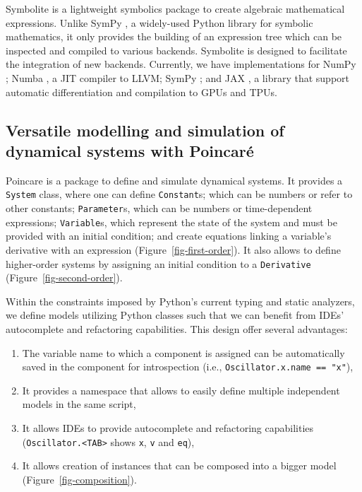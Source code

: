\documentclass{article}
\providecommand{\tightlist}{%
  \setlength{\itemsep}{0pt}\setlength{\parskip}{0pt}}\usepackage{longtable,booktabs}
\begin{document}
Symbolite is a lightweight symbolics package to create algebraic mathematical expressions.
Unlike SymPy \cite{meurerSymPySymbolicComputing2017},
a widely-used Python library for symbolic mathematics,
it only provides the building of an expression tree
which can be inspected and compiled to various backends.
Symbolite is designed to facilitate the integration of new backends.
Currently, we have implementations for
NumPy \cite{harrisArrayProgrammingNumPy2020};
Numba \cite{lamNumbaLLVMbasedPython2015},
a \ac{JIT} compiler to LLVM;
SymPy \cite{meurerSymPySymbolicComputing2017};
and JAX \cite{jax2018github}, a
library that support automatic differentiation and compilation to \acp{GPU} and \acp{TPU}.

\hypertarget{versatile-modelling-and-simulation-of-dynamical-systems-with-poincaruxe9}{%
\subsection{Versatile modelling and simulation of dynamical systems with
Poincaré}\label{versatile-modelling-and-simulation-of-dynamical-systems-with-poincaruxe9}}

Poincare is a package to define and simulate dynamical systems.
It provides a \texttt{System} class,
where one can define
\texttt{Constant}s; which can be numbers or refer to other constants;
\texttt{Parameter}s, which can be numbers or time-dependent expressions;
\texttt{Variable}s, which represent the state of the system and must be provided with an initial condition;
and create equations linking a variable's derivative with an expression (Figure~\ref{fig-first-order}).
It also allows to define higher-order systems
by assigning an initial condition to a \texttt{Derivative} (Figure~\ref{fig-second-order}).

Within the constraints imposed by Python's current typing and static analyzers,
we define models utilizing Python classes
such that we can benefit from \acp{IDE}' autocomplete and refactoring capabilities.
This design offer several advantages:

\begin{enumerate}
\def\labelenumi{\arabic{enumi}.}
\tightlist
\item
  The variable name to which a component is assigned can be automatically saved in the component for introspection
  (i.e., \texttt{Oscillator.x.name\ ==\ "x"}),
\item
  It provides a namespace that allows to easily define multiple independent models in the same script,
\item
  It allows \acp{IDE} to provide autocomplete and refactoring capabilities
  (\texttt{Oscillator.\textless{}TAB\textgreater{}} shows \texttt{x}, \texttt{v} and \texttt{eq}),
\item
  It allows creation of instances that can be composed into a bigger model (Figure~\ref{fig-composition}).
\end{enumerate}
\end{document}

